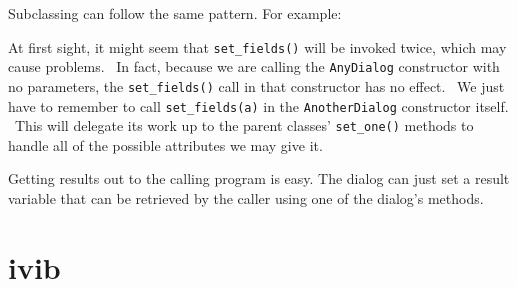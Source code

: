 Subclassing can follow the same pattern. For example:


At first sight, it might seem that \texttt{set\_fields()} will be
invoked twice, which may cause problems. \ In fact, because we are
calling the \texttt{AnyDialog} constructor with no parameters, the
\texttt{set\_fields()} call in that constructor has no effect. \ We
just have to remember to call \texttt{set\_fields(a)} in the
\texttt{AnotherDialog} constructor itself. \ This will delegate its
work up to the parent classes' \texttt{set\_one()}
methods to handle all of the possible attributes we may give it.

Getting results out to the calling program is easy. The dialog
can just set a result variable that can be retrieved by
the caller using one of the dialog's methods.

\section{\textsf{ivib}}

